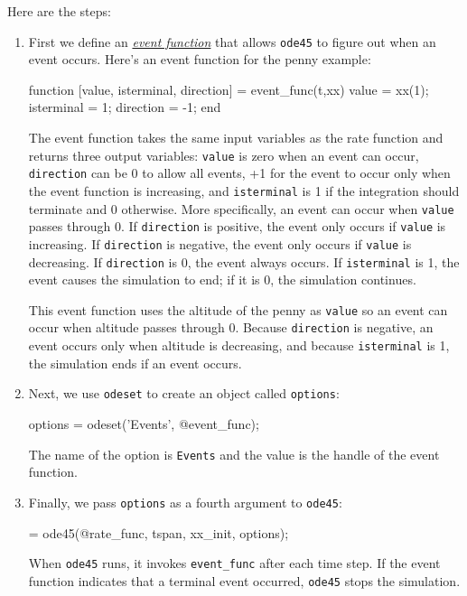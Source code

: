 Here are the steps:


\begin{enumerate}

\item First we define an \href{https://www.mathworks.com/help/matlab/math/ode-event-location.html}{\emph{event function}} that allows \lstinline{ode45} to figure out when
an event occurs.  Here's an event function for the penny example:

\begin{code}
function [value, isterminal, direction] = event_func(t,xx)
    value = xx(1);
    isterminal = 1;
    direction = -1;
end
\end{code}

The event function takes the same input variables as the rate function and returns three output variables: \lstinline{value} is zero when an event can occur, \lstinline{direction} can be 0 to allow all events, +1 for the event to occur only when the event function is increasing, and \lstinline{isterminal} is 1 if the integration should terminate and 0 otherwise. 
More specifically, an event can occur when \lstinline{value} passes through 0.
If \lstinline{direction} is positive, the event only occurs if \lstinline{value} is increasing.
 If \lstinline{direction} is negative, the event only occurs if \lstinline{value} is decreasing.
If \lstinline{direction} is 0, the event always occurs.
If \lstinline{isterminal} is 1, the event causes the simulation to end; if it is 0, the simulation continues.

This event function uses the altitude of the penny as \lstinline{value} so an event can occur when altitude passes through 0.
Because \lstinline{direction} is negative, an event occurs only when altitude is decreasing, and
because \lstinline{isterminal} is 1, the simulation ends if an event occurs.


\item Next, we use \lstinline{odeset} to create an object called \lstinline{options}:

\begin{code}
options = odeset('Events', @event_func);
\end{code}
%
The name of the option is \lstinline{Events} and the value is the handle of the event function.

\item Finally, we pass \lstinline{options} as a fourth argument to \lstinline{ode45}:

\begin{code}
 = ode45(@rate_func, tspan, xx_init, options);
\end{code}

When \lstinline{ode45} runs, it invokes \lstinline{event_func} after each time step.  If the event function indicates that a terminal event occurred,
\lstinline{ode45} stops the simulation.

\end{enumerate}

